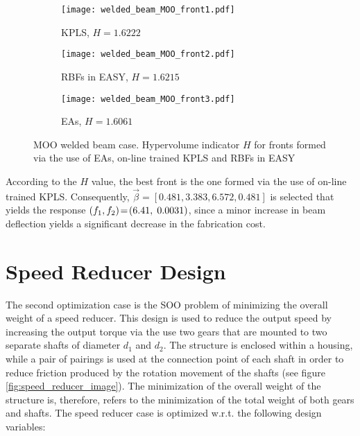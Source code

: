 \begin{figure}[h!]
\centering
	\begin{subfigure}[b]{0.45\textwidth}
	\centering
	\caption{KPLS, $H \!= \! 1.6222$ }
	\texttt{[image: welded\_beam\_MOO\_front1.pdf]}
	\end{subfigure}
\hfill
	\begin{subfigure}[b]{0.45\textwidth}
	\centering
	\caption{RBFs in EASY, $H \!= \! 1.6215$ }
	\texttt{[image: welded\_beam\_MOO\_front2.pdf]}
	\end{subfigure}
\hfill
	\begin{subfigure}[b]{0.45\textwidth}
	\centering
	\caption{EAs, $H \!= \! 1.6061$ }
	\texttt{[image: welded\_beam\_MOO\_front3.pdf]}
	\end{subfigure}
\caption{MOO welded beam case. Hypervolume indicator $H$ for 
fronts formed via the use of EAs, on-line trained KPLS and 
RBFs in EASY}
\label{fig:hypervolume_welded_beam}
\end{figure}

According to the $H$ value, the best front is the one formed via 
the use of on-line trained KPLS. Consequently, $\vec{β} = 
[0.481, 3.383, 6.572, 0.481]$ is selected that yields the response 
$(f_{1}, f_{2}) \!= \!(6.41, \hspace{1mm} 0.0031)$, since a 
minor increase in beam deflection yields a significant decrease in 
the fabrication cost.

\newpage


\section{Speed Reducer Design}

The second optimization case is the SOO problem of minimizing
the overall weight of a speed reducer. This design is used to 
reduce the output speed by increasing the output torque via
the use two gears that are mounted to two separate shafts of
diameter $d_{1}$ and $d_{2}$. The structure is enclosed 
within a housing, while a pair of pairings is used at the 
connection point of each shaft in order to reduce friction 
produced by the rotation movement of the shafts (see figure 
\ref{fig:speed_reducer_image}). The minimization of the overall 
weight of the structure is, therefore, refers to the minimization 
of the total weight of both gears and shafts. The speed reducer 
case\cite{Golinski} is optimized w.r.t. the following design 
variables:

